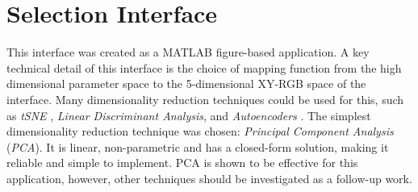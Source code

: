 \documentclass[11pt, oneside]{report}   	%
\begin{document}
\section{Selection Interface}\label{sec:SelectionDescription}
\vspace{-7pt} This interface was created as a MATLAB figure-based application. A key technical detail of this interface is the choice of mapping function from the high dimensional parameter space to the 5-dimensional XY-RGB space of the interface. Many dimensionality reduction techniques could be used for this, such as \emph{tSNE} \cite{InfiniteDrum}, \emph{Linear Discriminant Analysis}, and \emph{Autoencoders} \cite{NSynth}. The simplest dimensionality reduction technique was chosen: \emph{Principal Component Analysis} (\emph{PCA}). It is linear, non-parametric and has a closed-form solution, making it reliable and simple to implement. PCA is shown to be effective for this application, however, other techniques should be investigated as a follow-up work. \vspace{-5pt}
\end{document}
